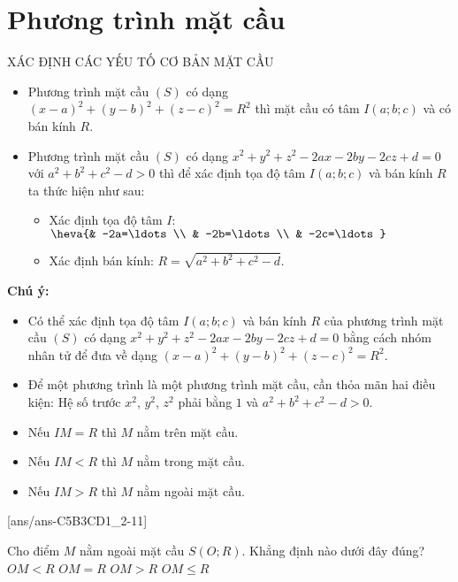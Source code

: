 \section{Phương trình mặt cầu}
	
\begin{dang}{XÁC ĐỊNH CÁC YẾU TỐ CƠ BẢN MẶT CẦU}
	\begin{itemize}
		\item Phương trình mặt cầu $(S)$ có dạng $(x-a)^2+(y-b)^2+(z-c)^2=R^2$ thì mặt cầu có tâm $I(a;b;c)$ và có bán kính $R$.
		\item Phương trình mặt cầu $(S)$ có dạng $x^2+y^2+z^2-2ax-2by-2cz+d=0$ với $a^2+b^2+c^2-d>0$ thì để xác định tọa độ tâm $I(a;b;c)$ và bán kính $R$ ta thức hiện như sau:
		\begin{itemize}
			\item Xác định tọa độ tâm $I$: $\heva{& -2a=\ldots \\ & -2b=\ldots \\ & -2c=\ldots}$
			\item Xác định bán kính: $R=\sqrt{a^2+b^2+c^2-d}$.
		\end{itemize}
	\end{itemize}
	\begin{note} \textbf{Chú ý:}
		\begin{itemize}
			\item Có thể xác định tọa độ tâm $I(a;b;c)$ và bán kính $R$ của phương trình mặt cầu $(S)$ có dạng $x^2+y^2+z^2-2ax-2by-2cz+d=0$ bằng cách nhóm nhân tử để đưa về dạng $(x-a)^2+(y-b)^2+(z-c)^2=R^2$.
			\item Để một phương trình là một phương trình mặt cầu, cần thỏa mãn hai điều kiện: Hệ số trước $x^2$, $y^2$, $z^2$ phải bằng $1$ và $a^2+b^2+c^2-d>0$.
			\item Nếu $IM=R$ thì $M$ nằm trên mặt cầu.
			\item Nếu $IM<R$ thì $M$ nằm trong mặt cầu.
			\item Nếu $IM>R$ thì $M$ nằm ngoài mặt cầu.
		\end{itemize}
	\end{note}
\end{dang}
[ans/ans-C5B3CD1_2-11]
\TN

\begin{ex}%
	Cho điểm $M$ nằm ngoài mặt cầu $S(O;R)$. Khẳng định nào dưới đây đúng?
	\choice
	{$OM<R$}
	{$OM=R$}
	{\True $OM>R$}
	{$OM\le R$}
\end{ex}

